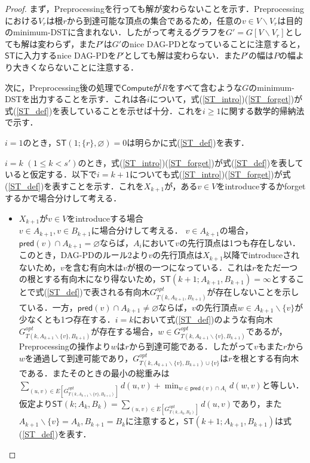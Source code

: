 \documentclass[master]{kuisthesis}		%
\theoremstyle{plain}
\theoremstyle{definition}
\begin{document}
\begin{proof}
    まず，Preprocessingを行っても解が変わらないことを示す．Preprocessingにおける$V_r$は根$r$から到達可能な頂点の集合であるため，任意の$v \in V \backslash V_r$は目的のminimum-DSTに含まれない．したがって考えるグラフを$G' = G[V \backslash V_r]$としても解は変わらず，また$P'$は$G'$のnice DAG-PDとなっていることに注意すると，$\mathsf{ST}$に入力するnice DAG-PDを$P'$としても解は変わらない．また$P'$の幅は$P$の幅より大きくならないことに注意する．

    次に，Preprocessing後の処理で$\mathsf{Compute}$が$R$をすべて含むような$G$のminimum-DSTを出力することを示す．これは各$i$について，式(\ref{ST_intro})(\ref{ST_forget})が式(\ref{ST_def})を表していることを示せば十分．これを$i \geq 1$に関する数学的帰納法で示す．    
 
    
    $i=1$のとき，$\mathsf{ST}(1; \{r\}, \varnothing) = 0$は明らかに式(\ref{ST_def})を表す．
    
    $i=k$ $(1 \leq k < s')$のとき，式(\ref{ST_intro})(\ref{ST_forget})が式(\ref{ST_def})を表していると仮定する．以下で$i = k+1$についても式(\ref{ST_intro})(\ref{ST_forget})が式(\ref{ST_def})を表すことを示す．これを$X_{k+1}$が，ある$v \in V$をintroduceするかforgetするかで場合分けして考える．

    
    \begin{itemize}
        \item $X_{k+1}$が$v \in V$をintroduceする場合 \\
        $v \in A_{k+1}, v \in B_{k+1}$に場合分けして考える．
        $v \in A_{k+1}$の場合，$\mathsf{pred}(v) \cap A_{k+1} = \varnothing$ならば，$A_i$において$v$の先行頂点は1つも存在しない．このとき，DAG-PDのルール2より$v$の先行頂点は$X_{k+1}$以降でintroduceされないため，$v$を含む有向木は$v$が根の一つになっている．これは$r$をただ一つの根とする有向木になり得ないため，$\mathsf{ST}(k+1; A_{k+1}, B_{k+1}) = \infty$とすることで式(\ref{ST_def})で表される有向木$G^{opt}_{T(k, A_{k+1}, B_{k+1})}$が存在しないことを示している．一方，$\mathsf{pred}(v) \cap A_{k+1} \neq \varnothing$ならば，$v$の先行頂点$w \in A_{k+1} \backslash \{v\}$が少なくとも1つ存在する．$i=k$において式(\ref{ST_def})のような有向木 $G^{opt}_{T(k, A_{k+1} \backslash \{v\}, B_{k+1})}$が存在する場合，$w \in G^{opt}_{T(k,A_{k+1} \backslash \{v\}, B_{k+1})}$であるが，Preprocessingの操作より$w$は$r$から到達可能である．したがって$v$もまた$r$から$w$を通過して到達可能であり，$G^{opt}_{T(k, A_{k+1} \backslash \{v\}, B_{k+1}) \cup \{v\}}$は$r$を根とする有向木である．またそのときの最小の総重みは$ \sum_{(u, v) \in E[G^{opt}_{T(k, A_{k+1} \backslash \{v\}, B_{k+1})}]} d(u, v) + \displaystyle \min_{w \in \mathsf{pred}(v) \cap A_i} d(w, v)$と等しい．仮定より$\mathsf{ST}(k; A_k, B_k) =  \sum_{(u, v) \in E[G^{opt}_{T(k, A_k, B_k)}]} d(u, v)$であり，また$A_{k+1} \backslash \{v\} = A_k, B_{k+1} = B_k$に注意すると，$\mathsf{ST}(k+1; A_{k+1}, B_{k+1})$は式(\ref{ST_def})を表す．


\end{itemize}
\end{proof}
\end{document}
